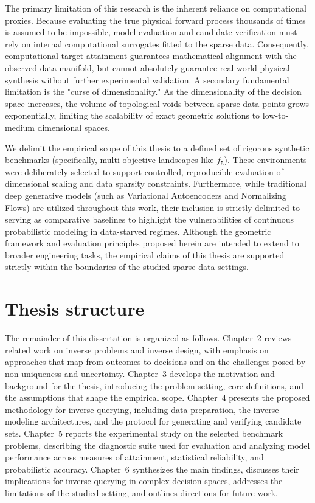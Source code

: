 The primary limitation of this research is the inherent reliance on computational proxies. Because evaluating the true physical forward process thousands of times is assumed to be impossible, model evaluation and candidate verification must rely on internal computational surrogates fitted to the sparse data. Consequently, computational target attainment guarantees mathematical alignment with the observed data manifold, but cannot absolutely guarantee real-world physical synthesis without further experimental validation. A secondary fundamental limitation is the "curse of dimensionality." As the dimensionality of the decision space increases, the volume of topological voids between sparse data points grows exponentially, limiting the scalability of exact geometric solutions to low-to-medium dimensional spaces.

We delimit the empirical scope of this thesis to a defined set of rigorous synthetic benchmarks (specifically, multi-objective landscapes like $f_5$). These environments were deliberately selected to support controlled, reproducible evaluation of dimensional scaling and data sparsity constraints. Furthermore, while traditional deep generative models (such as Variational Autoencoders and Normalizing Flows) are utilized throughout this work, their inclusion is strictly delimited to serving as comparative baselines to highlight the vulnerabilities of continuous probabilistic modeling in data-starved regimes. Although the geometric framework and evaluation principles proposed herein are intended to extend to broader engineering tasks, the empirical claims of this thesis are supported strictly within the boundaries of the studied sparse-data settings.

\section{Thesis structure}
The remainder of this dissertation is organized as follows. Chapter~2 reviews related work on inverse problems and inverse design, with emphasis on approaches that map from outcomes to decisions and on the challenges posed by non-uniqueness and uncertainty. Chapter~3 develops the motivation and background for the thesis, introducing the problem setting, core definitions, and the assumptions that shape the empirical scope. Chapter~4 presents the proposed methodology for inverse querying, including data preparation, the inverse-modeling architectures, and the protocol for generating and verifying candidate sets. Chapter~5 reports the experimental study on the selected benchmark problems, describing the diagnostic suite used for evaluation and analyzing model performance across measures of attainment, statistical reliability, and probabilistic accuracy. Chapter~6 synthesizes the main findings, discusses their implications for inverse querying in complex decision spaces, addresses the limitations of the studied setting, and outlines directions for future work.